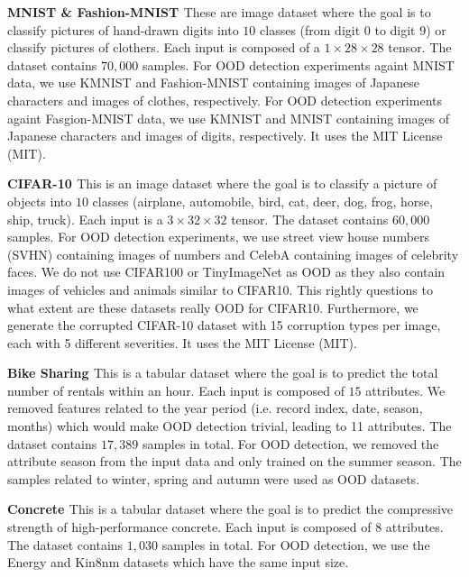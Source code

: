\textbf{MNIST \citep{mnist} \& Fashion-MNIST \citep{fashion-mnist}} These are image dataset where the goal is to classify pictures of hand-drawn digits into $10$ classes (from digit $0$ to digit $9$) or classify pictures of clothers. Each input is composed of a $1 \times 28 \times 28$ tensor. The dataset contains $70,000$ samples. For OOD detection experiments againt MNIST data, we use KMNIST \citep{kmnist} and Fashion-MNIST \citep{fashion-mnist} containing images of Japanese characters and images of clothes, respectively. For OOD detection experiments againt Fasgion-MNIST data, we use KMNIST \citep{kmnist} and MNIST \citep{mnist} containing images of Japanese characters and images of digits, respectively. It uses the MIT License (MIT).

\textbf{CIFAR-10 \citep{cifar10}} This is an image dataset where the goal is to classify a picture of objects into $10$ classes (airplane, automobile, bird, cat, deer, dog, frog, horse, ship, truck). Each input is a $3 \times 32 \times 32$ tensor. The dataset contains $60,000$ samples. For OOD detection experiments, we use street view house numbers (SVHN) \citep{svhn} containing images of numbers and CelebA \citep{celeba} containing images of celebrity faces. We do not use CIFAR100 \citep{cifar10} or TinyImageNet \citep{tiny-imagenet} as OOD as they also contain images of vehicles and animals similar to CIFAR10. This rightly questions to what extent are these datasets really OOD for CIFAR10. Furthermore, we generate the corrupted CIFAR-10 dataset \citep{benchmarking-corruptions} with 15 corruption types per image, each with 5 different severities. It uses the MIT License (MIT).

\textbf{Bike Sharing \citep{bike-sharing}} This is a tabular dataset where the goal is to predict the total number of rentals within an hour. Each input is composed of $15$ attributes. We removed features related to the year period (i.e. record index, date, season, months) which would make OOD detection trivial, leading to 11 attributes. The dataset contains $17,389$ samples in total. For OOD detection, we removed the attribute season from the input data and only trained on the summer season. The samples related to winter, spring and autumn were used as OOD datasets.

\textbf{Concrete \citep{uci}} This is a tabular dataset where the goal is to predict the compressive strength of high-performance concrete. Each input is composed of $8$ attributes. The dataset contains $1,030$ samples in total. For OOD detection, we use the Energy and Kin8nm datasets which have the same input size.

